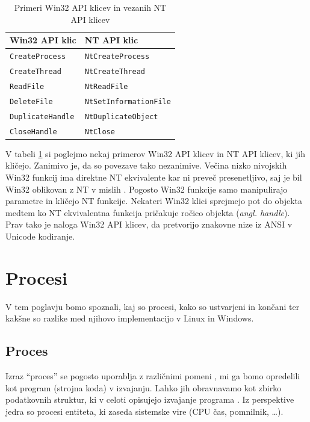 \documentclass[a4paper,12pt,openright]{book}
\begin{document}
\begin{table}[h!]
	\begin{center}
		\begin{tabular}{ l|l }
			Win32 API klic         & NT API klic                 \\
			\hline
			\verb|CreateProcess|   & \verb|NtCreateProcess|      \\
			\verb|CreateThread|    & \verb|NtCreateThread|       \\
			\verb|ReadFile|        & \verb|NtReadFile|           \\
			\verb|DeleteFile|      & \verb|NtSetInformationFile| \\
			\verb|DuplicateHandle| & \verb|NtDuplicateObject|    \\
			\verb|CloseHandle|     & \verb|NtClose|              \\
		\end{tabular}
	\end{center}
	\caption{Primeri Win32 API klicev in vezanih NT API klicev \cite{Tanenbaum_Bos_2023}}
	\label{tab:example_win32_nt_mapping}
\end{table}

V tabeli \ref{tab:example_win32_nt_mapping} si poglejmo nekaj primerov Win32 API klicev in NT API klicev, ki jih kličejo.
Zanimivo je, da so povezave tako nezanimive.
Večina nizko nivojskih Win32 funkcij ima direktne NT ekvivalente kar ni preveč presenetljivo, saj je bil Win32 oblikovan z NT v mislih \cite{Tanenbaum_Bos_2023}.
Pogosto Win32 funkcije samo manipulirajo parametre in kličejo NT funkcije.
Nekateri Win32 klici sprejmejo pot do objekta medtem ko NT ekvivalentna funkcija pričakuje ročico objekta (\textit{angl. handle}).
Prav tako je naloga Win32 API klicev, da pretvorijo znakovne nize iz ANSI v Unicode kodiranje.

\chapter{Procesi}

V tem poglavju bomo spoznali, kaj so procesi, kako so ustvarjeni in končani ter kakšne so razlike med njihovo implementacijo v Linux in Windows.

\section{Proces}

Izraz ``proces'' se pogosto uporablja z različnimi pomeni \cite{Bovet_Cesati_2005}, mi ga bomo opredelili kot program (strojna koda) v izvajanju.
Lahko jih obravnavamo kot zbirko podatkovnih struktur, ki v celoti opisujejo izvajanje programa \cite{Bovet_Cesati_2005}.
Iz perspektive jedra so procesi entiteta, ki zaseda sistemske vire (CPU čas, pomnilnik, \dots).
\end{document}
